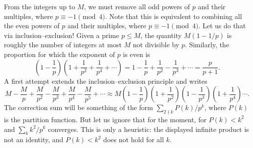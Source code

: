 \documentclass[11pt,a4paper]{article}
\begin{document}
From the integers up to $M$, we must remove all odd powers of $p$ and their
multiples, where $p\equiv-1\pmod4$. Note that this is equivalent to combining
all the even powers of $p$ and their multiples, where
$p\equiv-1\pmod4$. Let us do that via inclusion--exclusion!
Given a prime $p\le M$, the quantity $M(1-1/p)$ is roughly the number of
integers at most $M$ not divisible by $p$. Similarly, the proportion for
which the exponent of $p$ is even is
\[
 \left(1-\frac1p\right)
 \left(1+\frac1{p^2}+\frac1{p^4}+\cdots\right)
 =1-\frac1p+\frac1{p^2}-\frac1{p^3}+\cdots
 =\frac p{p+1}.
\]
A first attempt extends the inclusion--exclusion principle and writes
\[
 M-\frac Mp+\frac M{p^2}-\frac M{p^3}+\frac M{p^4}-\frac M{p^5}+\cdots
 \approx M\left(1-\frac1p\right)\left(1+\frac1{p^2}\right)
 \left(1-\frac1{p^3}\right)\left(1+\frac1{p^4}\right)\cdots.
\]
The correction sum will be something of the form
$\sum_{2\nmid k}P(k)/p^k$, where $P(k)$ is the partition function.
But let us ignore that for the moment, for $P(k)<k^2$ and
$\sum_k k^2/p^k$ converges. This is only a heuristic: the displayed infinite
product is not an identity, and $P(k)<k^2$ does not hold for all $k$.
\end{document}
